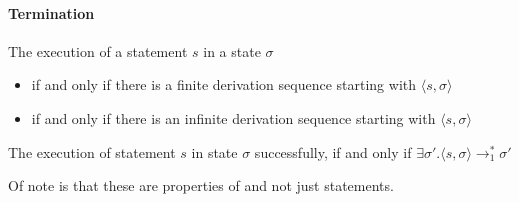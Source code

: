\paragraph{Termination}
\inlinetheorem The execution of a statement $s$ in a state $\sigma$
\begin{itemize}
    \item {} if and only if there is a finite derivation sequence starting with $\langle s, \sigma \rangle$
    \item {} if and only if there is an infinite derivation sequence starting with $\langle s, \sigma \rangle$
\end{itemize}

\inlinetheorem The execution of statement $s$ in state $\sigma$  successfully, if and only if $\exists \sigma'. \langle s, \sigma \rangle \rightarrow^*_1 \sigma'$

Of note is that these are properties of  and not just statements.
